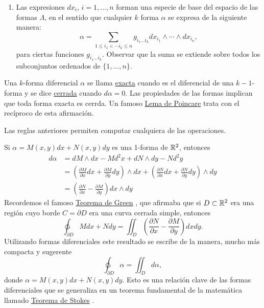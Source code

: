\begin{subappendices}
\begin{enumerate}
\begin{enumerate}
  \end{enumerate}
  \item Las expresiones $dx_i$, $i=1,\ldots,n$ forman una especie de base del espacio de las formas $\Lambda$, en el sentido que cualquier $k$ forma $\alpha$ se expresa de la siguiente manera:
  \[\alpha=\sum_{1\leq i_1<\cdots i_k\leq n}g_{i_1\ldots i_k} dx_{i_1}\wedge\cdots\wedge dx_{i_n},\]
  para ciertas funciones $g_{i_1\ldots i_k}$. Observar que la suma se extiende sobre todos los subconjuntos ordenados de $\{1,\ldots,n\}$.
\end{enumerate}


Una $k$-forma diferencial $\alpha$ se llama \href{https://es.wikipedia.org/wiki/Formas_diferenciales_cerradas_y_exactas}{exacta}  cuando es el diferencial de una $k-1$-forma y se dice \href{https://es.wikipedia.org/wiki/Formas_diferenciales_cerradas_y_exactas}{cerrada}  cuando $d\alpha=0$. Las propiedades de las formas implican que toda forma exacta es cerrda. Un famoso \href{https://es.wikipedia.org/wiki/Formas_diferenciales_cerradas_y_exactas#Lema_de_Poincar.C3.A9}{Lema de Poincare}  trata con el recíproco de esta afirmación.

Las reglas anteriores permiten computar cualquiera de las operaciones.
\begin{ejemplo}{} Si $\alpha=M(x,y)dx+N(x,y)dy$ es una 1-forma de $\mathbb{R}^2$, entonces
\[ \begin{split}
    d\alpha&=dM\wedge dx-Md^2x + dN\wedge dy-Nd^2y\\
    &=\left(\frac{\partial M}{\partial x}dx+ \frac{\partial M}{\partial y}dy\right)\wedge dx+
    \left(\frac{\partial N}{\partial x}dx+ \frac{\partial N}{\partial y}dy\right)\wedge dy\\
    &= \left(\frac{\partial N}{\partial x}- \frac{\partial M}{\partial y}\right) dx\wedge dy
   \end{split}
\]
Recordemos el famoso \href{https://es.wikipedia.org/wiki/Teorema_de_Green}{Teorema de Green} , que afirmaba que si $D\subset \mathbb{R}^2$ era una región cuyo borde $C=\partial D$ era una curva cerrada simple, entonces
\[\ointctrclockwise_{\partial D} Mdx +Ndy=\iint_D \left(\frac{\partial N}{\partial x}- \frac{\partial M}{\partial y}\right) dx dy.\]
Utilizando formas diferenciales este resultado se escribe de la manera, mucho más compacta y sugerente
\[\ointctrclockwise_{\partial D} \alpha = \iint_Dd\alpha,\]
donde $\alpha =M(x,y)dx+N(x,y)dy$.  Esto es una relación clave de las formas diferenciales que se generaliza en un teorema fundamental de la matemática llamado \href{https://es.wikipedia.org/wiki/Teorema_de_Stokes}{Teorema de Stokes} .
\end{ejemplo}





\end{subappendices}
